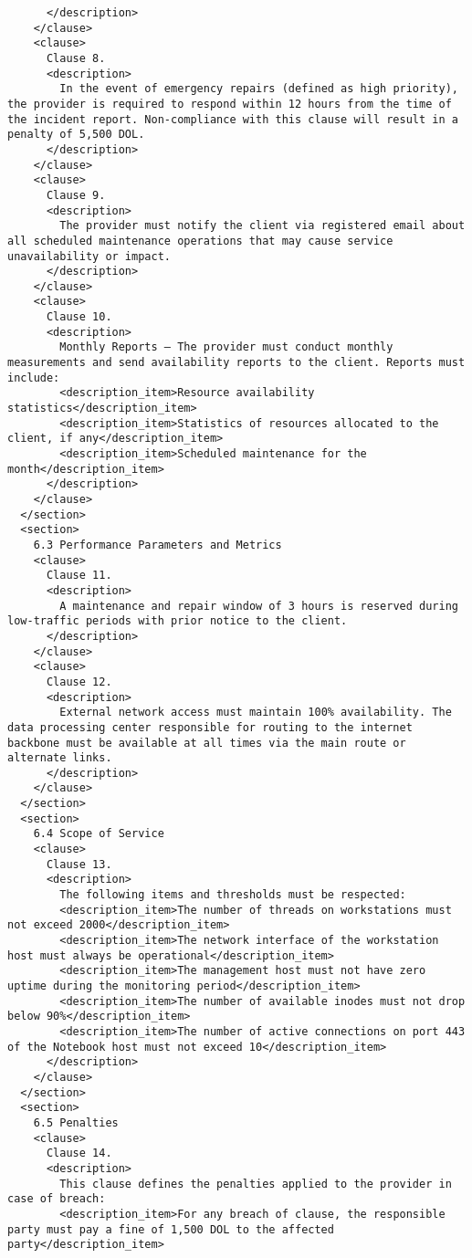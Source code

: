 \begin{lstlisting}
      </description>
    </clause>
    <clause>
      Clause 8.
      <description>
        In the event of emergency repairs (defined as high priority), the provider is required to respond within 12 hours from the time of the incident report. Non-compliance with this clause will result in a penalty of 5,500 DOL.
      </description>
    </clause>
    <clause>
      Clause 9.
      <description>
        The provider must notify the client via registered email about all scheduled maintenance operations that may cause service unavailability or impact.
      </description>
    </clause>
    <clause>
      Clause 10.
      <description>
        Monthly Reports – The provider must conduct monthly measurements and send availability reports to the client. Reports must include:
        <description_item>Resource availability statistics</description_item>
        <description_item>Statistics of resources allocated to the client, if any</description_item>
        <description_item>Scheduled maintenance for the month</description_item>
      </description>
    </clause>
  </section>
  <section>
    6.3 Performance Parameters and Metrics
    <clause>
      Clause 11.
      <description>
        A maintenance and repair window of 3 hours is reserved during low-traffic periods with prior notice to the client.
      </description>
    </clause>
    <clause>
      Clause 12.
      <description>
        External network access must maintain 100% availability. The data processing center responsible for routing to the internet backbone must be available at all times via the main route or alternate links.
      </description>
    </clause>
  </section>
  <section>
    6.4 Scope of Service
    <clause>
      Clause 13.
      <description>
        The following items and thresholds must be respected:
        <description_item>The number of threads on workstations must not exceed 2000</description_item>
        <description_item>The network interface of the workstation host must always be operational</description_item>
        <description_item>The management host must not have zero uptime during the monitoring period</description_item>
        <description_item>The number of available inodes must not drop below 90%</description_item>
        <description_item>The number of active connections on port 443 of the Notebook host must not exceed 10</description_item>
      </description>
    </clause>
  </section>
  <section>
    6.5 Penalties
    <clause>
      Clause 14.
      <description>
        This clause defines the penalties applied to the provider in case of breach:
        <description_item>For any breach of clause, the responsible party must pay a fine of 1,500 DOL to the affected party</description_item>

\end{lstlisting}
